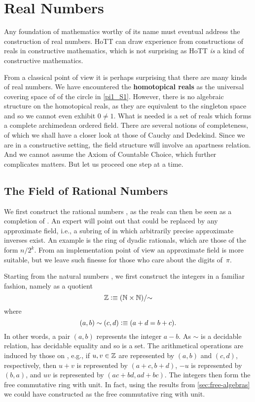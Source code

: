 \newcommand{\rclim}{\mathsf{lim}} %

\chapter{Real Numbers}
\label{cha:real-numbers}

Any foundation of mathematics worthy of its name must eventual address the construction of
real numbers. HoTT can draw experience from constructions of reals in constructive
mathematics, which is not surprising as HoTT \emph{is} a kind of constructive mathematics.

From a classical point of view it is perhaps surprising that there are many kinds of real
numbers. We have encountered the \textbf{homotopical reals} as the universal covering
space of of the circle in \autoref{pi1_S1}. However, there is no algebraic structure on
the homotopical reals, as they are equivalent to the singleton space and so we cannot even
exhibit $0 \neq 1$. What is needed is a set of reals which forms a complete archimedean
ordered field. There are several notions of completeness, of which we shall have a closer
look at those of Cauchy and Dedekind. Since we are in a constructive setting, the field
structure will involve an apartness relation. And we cannot assume the Axiom of Countable
Choice, which further complicates matters. But let us proceed one step at a time.

\section{The Field of Rational Numbers}
\label{sec:field-rati-numb}

We first construct the rational numbers \Q, as the reals can then be seen as a completion
of \Q. An expert will point out that \Q could be replaced by any approximate field, i.e.,
a subring of \Q in which arbitrarily precise approximate inverses exist. An example is the
ring of dyadic rationals, which are those of the form $n/2^k$. From an
implementation point of view an approximate field is more suitable, but we leave such
finesse for those who care about the digits of~$\pi$.

Starting from the natural numbers \N, we first construct the integers in a familiar
fashion, namely as a quotient
%
\[ \mathbb{Z} \vcentcolon\equiv (\mathbb{N} \times \mathbb{N})/{\sim} \]
%
where
%
\[ (a,b) \sim (c,d) \vcentcolon\equiv (a + d = b + c). \]
%
In other words, a pair $(a,b)$ represents the integer $a - b$. As $\sim$ is a decidable
relation, \Z has decidable equality and so is a set. The arithmetical operations are
induced by those on \N, e.g., if $u, v \in \mathbb{Z}$ are represented by $(a,b)$ and $(c,d)$,
respectively, then $u + v$ is represented by $(a + c, b + d)$, $-u$ is represented by $(b,
a)$, and $u v$ is represented by $(a c + b d, a d + b c)$. The integers \Z then form the
free commutative ring with unit. In fact, using the results from
\autoref{sec:free-algebras} we could have constructed \Z as the free commutative ring with
unit.

